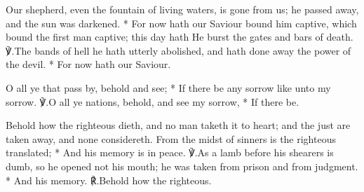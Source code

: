 \documentclass[12pt]{book}
\begin{document}


\silently


\begin{enpars}
Our shepherd, even the fountain of living waters, is gone from us; he passed away, and the sun was darkened.
* For now hath our Saviour bound him captive, which bound the first man captive; this day hath He burst the gates and bars of death.
℣.\@ The bands of hell he hath utterly abolished, and hath done away the power of the devil.
* For now hath our Saviour.
\end{enpars}


\begin{enpars}
O all ye that pass by, behold and see;
* If there be any sorrow like unto my sorrow.
℣.\@ O all ye nations, behold, and see my sorrow,
* If there be.
\end{enpars}


\begin{enpars}
Behold how the righteous dieth, and no man taketh it to heart; and the just are taken away, and none considereth. From the midst of sinners is the righteous translated;
* And his memory is in peace.
℣.\@ As a lamb before his shearers is dumb, so he opened not his mouth; he was taken from prison and from judgment.
* And his memory.
℟.\@ Behold how the righteous.
\end{enpars}



\end{document}
